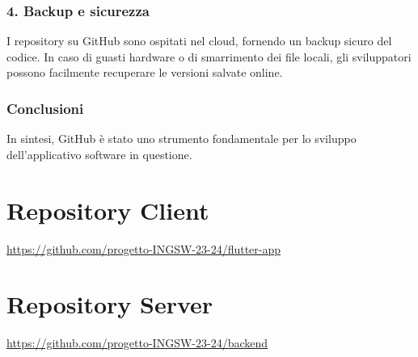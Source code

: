 \subsubsection*{4. Backup e sicurezza}
I repository su GitHub sono ospitati nel cloud, fornendo un backup sicuro del codice. In caso di guasti hardware o di smarrimento dei file locali, gli sviluppatori possono facilmente recuperare le versioni salvate online.

\subsubsection{Conclusioni}
In sintesi, GitHub è stato uno strumento fondamentale per lo sviluppo dell'applicativo software in questione. 


\section{Repository Client}
\url{https://github.com/progetto-INGSW-23-24/flutter-app}

\section{Repository Server}
\url{https://github.com/progetto-INGSW-23-24/backend}

